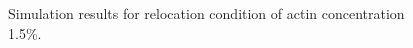 \documentclass[a4paper,12pt]{book}
\begin{document}
\begin{figure}[h]
{ }%
 \caption{Simulation results for relocation condition of actin concentration 1.5\%.}
 \label{fig:res4}
\end{figure}
\end{document}
